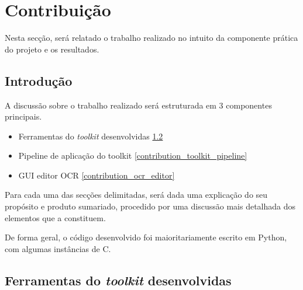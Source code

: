 \chapter{Contribuição}
\label{cap_contribuicao}

Nesta secção, será relatado o trabalho realizado no intuito da componente prática do projeto e os resultados. 

\section{Introdução}

A discussão sobre o trabalho realizado será estruturada em 3 componentes principais.
\begin{itemize}
	\item Ferramentas do \textit{toolkit} desenvolvidas \ref{contribution_toolkit}
	\item Pipeline de aplicação do toolkit \ref{contribution_toolkit_pipeline}
	\item GUI editor OCR \ref{contribution_ocr_editor}
\end{itemize}

Para cada uma das secções delimitadas, será dada uma explicação do seu propósito e produto sumariado, procedido por uma discussão mais detalhada dos elementos que a constituem.

De forma geral, o código desenvolvido foi maioritariamente escrito em Python, com algumas instâncias de C.

\section{Ferramentas do \textit{toolkit} desenvolvidas}
\label{contribution_toolkit}

